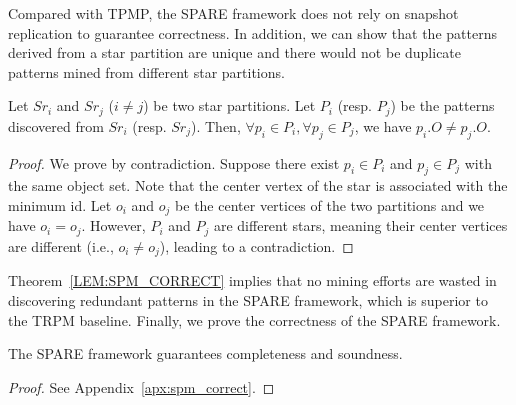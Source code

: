 Compared with TPMP, the SPARE framework does not rely on snapshot replication to guarantee correctness. In addition, we can show that the patterns derived from a star partition are unique and there would not be duplicate patterns mined from different star partitions.
\begin{theorem}
\label{LEM:SPM_CORRECT}
Let $Sr_i$ and $Sr_j$ ($i\neq j$) be two star partitions. Let $P_i$ (resp. $P_j$) be 
the patterns discovered from $Sr_i$ (resp. $Sr_j$). 
Then, $\forall p_i \in P_i, \forall p_j \in P_j$, we have $p_i.O \neq p_j.O$.
\end{theorem}
\begin{proof}
We prove by contradiction. Suppose there exist $p_i \in P_i$ and $p_j \in P_j$ with the same object set. Note that the center vertex of the star is associated with the minimum id. Let $o_i$ and $o_j$ be the center vertices of the two partitions and we have $o_i=o_j$. However, $P_i$ and $P_j$ are different stars, meaning their center vertices are different (i.e., $o_i\neq o_j$), leading to a contradiction. 
\end{proof}

Theorem~\ref{LEM:SPM_CORRECT} implies that no mining efforts are wasted in discovering redundant patterns  
in the SPARE framework, which is superior to the TRPM baseline. Finally, we prove the correctness of the SPARE framework.
\begin{theorem}
\label{THM:SPM_CORRECT}
The SPARE framework guarantees completeness and soundness.
\end{theorem}
\begin{proof}
See Appendix~\ref{apx:spm_correct}.
\end{proof}
